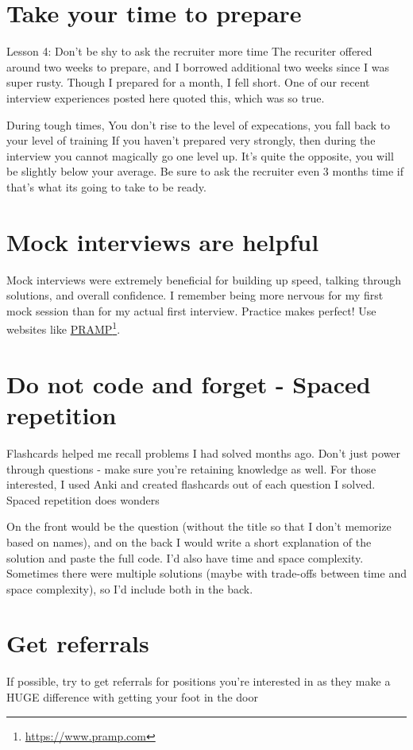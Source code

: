 \section{Take your time to prepare}
Lesson 4: Don't be shy to ask the recruiter more time The recuriter offered around two weeks to
prepare, and I borrowed additional two weeks since I was super rusty. Though I prepared for a month,
I fell short. One of our recent interview experiences posted here quoted this, which was so true.

During tough times, You don't rise to the level of expecations, you fall back to your level of
training If you haven't prepared very strongly, then during the interview you cannot magically go
one level up. It's quite the opposite, you will be slightly below your average. Be sure to ask the
recruiter even 3 months time if that's what its going to take to be ready.

\section{Mock interviews are helpful}
Mock interviews were extremely beneficial for building up speed, talking through solutions, and overall confidence.
I remember being more nervous for my first mock session than for my actual first interview. Practice makes perfect!
Use websites like \href{https://www.pramp.com}{PRAMP}\footnote{\url{https://www.pramp.com}}.


\section{Do not code and forget - Spaced repetition}
Flashcards helped me recall problems I had solved months ago. Don't just power through questions - make sure you're retaining knowledge as well. For those interested, 
I used Anki and created flashcards out of each question I solved. Spaced repetition does wonders

On the front would be the question 
(without the title so that I don't memorize based on names),
 and on the back I would write a short explanation of the solution and paste the full code. 
 I'd also have time and space complexity.
 Sometimes there were multiple solutions (maybe with trade-offs between time and space complexity), so I'd include both in the back.

\section{Get referrals}
If possible, try to get referrals for positions you're interested in as they make a HUGE difference with getting your foot in the door

